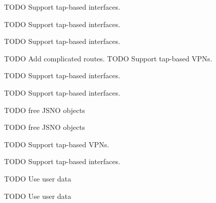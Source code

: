 
\begin{DoxyRefList}
\item[\label{todo__todo000005}%
\Hypertarget{todo__todo000005}%
Member \hyperlink{main_8c_a345bf2d3cf0cd82bcbbba3e054eafd48}{find\+\_\+primary\+\_\+if\+\_\+index} ()]T\+O\+DO Support tap-\/based interfaces. 
\item[\label{todo__todo000006}%
\Hypertarget{todo__todo000006}%
Member \hyperlink{main_8c_a6f5d8c51479e6196fb3d19e3538a46d0}{get\+\_\+if\+\_\+info} (struct ifaddrs $\ast$ifa, int family, enum I\+F\+\_\+\+T\+R\+A\+V\+E\+R\+S\+E\+\_\+\+M\+O\+DE tr\+\_\+mode)]T\+O\+DO Support tap-\/based interfaces. 
\item[\label{todo__todo000001}%
\Hypertarget{todo__todo000001}%
Member \hyperlink{app-profile_8c_a7ab4018359451259c67e57c83f9b7062}{get\+\_\+openvpn\+\_\+profile\+\_\+name} (char profile\+\_\+name\mbox{[}M\+A\+X\+\_\+\+V\+P\+N\+\_\+\+P\+R\+O\+F\+I\+L\+E\+\_\+\+N\+A\+ME\mbox{]})]T\+O\+DO Support tap-\/based interfaces. 
\item[\label{todo__todo000009}%
\Hypertarget{todo__todo000009}%
Member \hyperlink{main_8c_a25501fb2b3310a216de1ece7fa86e233}{get\+\_\+routes} ()]T\+O\+DO Add complicated routes. T\+O\+DO Support tap-\/based V\+P\+Ns. 
\item[\label{todo__todo000002}%
\Hypertarget{todo__todo000002}%
Member \hyperlink{app-profile_8c_aa32bea11cb1c8f99a45bc62cc8f5e455}{get\+\_\+vpn\+\_\+profile\+\_\+name} (enum V\+P\+N\+\_\+\+M\+E\+T\+H\+O\+DS vpn\+\_\+method, char profile\+\_\+name\mbox{[}M\+A\+X\+\_\+\+V\+P\+N\+\_\+\+P\+R\+O\+F\+I\+L\+E\+\_\+\+N\+A\+ME\mbox{]})]T\+O\+DO Support tap-\/based interfaces. 
\item[\label{todo__todo000010}%
\Hypertarget{todo__todo000010}%
Member \hyperlink{app-profile_8h_a2af00bda795682f62e77417d4969e2e5}{get\+\_\+vpn\+\_\+profile\+\_\+name} (enum V\+P\+N\+\_\+\+M\+E\+T\+H\+O\+DS vpn\+\_\+method, char profile\+\_\+name\mbox{[}M\+A\+X\+\_\+\+V\+P\+N\+\_\+\+N\+A\+ME\mbox{]})]T\+O\+DO Support tap-\/based interfaces. 
\item[\label{todo__todo000003}%
\Hypertarget{todo__todo000003}%
Member \hyperlink{gnode-object_8c_af75477fcbe781bc0b17c75c1ad6d1606}{net\+\_\+device\+\_\+free} (Net\+Device $\ast$nd)]T\+O\+DO free J\+S\+NO objects

T\+O\+DO free J\+S\+NO objects 
\item[\label{todo__todo000008}%
\Hypertarget{todo__todo000008}%
Member \hyperlink{main_8c_a9af8032bea78a008241c6a446021e90b}{public\+\_\+ip\+\_\+retrieve} ()]T\+O\+DO Support tap-\/based V\+P\+Ns. 
\item[\label{todo__todo000007}%
\Hypertarget{todo__todo000007}%
Member \hyperlink{main_8c_a5e3d195dba2da8b65b35a85c7834dfa2}{traverse\+\_\+ifs} (struct ifaddrs $\ast$ifaddr, enum I\+F\+\_\+\+T\+R\+A\+V\+E\+R\+S\+E\+\_\+\+M\+O\+DE tr\+\_\+mode)]T\+O\+DO Support tap-\/based interfaces. 
\item[\label{todo__todo000004}%
\Hypertarget{todo__todo000004}%
Member \hyperlink{gnode-object_8c_acde5d3e413f355d1b912f0dcb9d4cdc1}{traverse\+\_\+json\+\_\+func} (G\+Node $\ast$node, gpointer data)]T\+O\+DO Use user data

T\+O\+DO Use user data
\end{DoxyRefList}